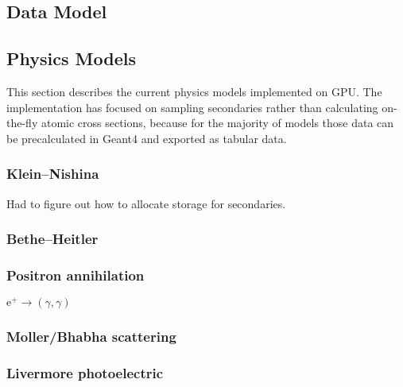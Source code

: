\documentclass{webofc}
\begin{document}


\subsection{Data Model}
\label{sec:data-model}



\subsection{Physics Models}
\label{sec:physics-models}

This section describes the current physics models implemented on GPU. The
implementation has focused on sampling secondaries rather than calculating
on-the-fly atomic cross sections, because for the majority of models those data
can be precalculated in Geant4 and exported as tabular data.

\subsubsection{Klein--Nishina}

Had to figure out how to allocate storage for secondaries.

\subsubsection{Bethe--Heitler}


\subsubsection{Positron annihilation}

$\textrm{e}^+ \to (\gamma, \gamma)$

\subsubsection{Moller/Bhabha scattering}


\subsubsection{Livermore photoelectric}
\end{document}
